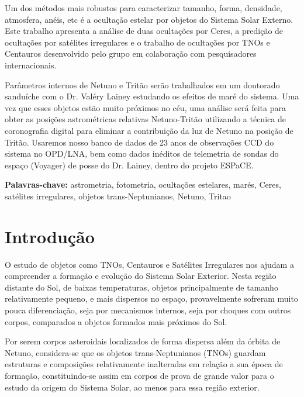 \documentclass[12pt,a4paper]{monografia}
\begin{document}
Um dos métodos mais robustos para caracterizar tamanho, forma, densidade, atmosfera, anéis, etc é a ocultação estelar por objetos do Sistema Solar Externo. Este trabalho apresenta a análise de duas ocultações por Ceres, a predição de ocultações por satélites irregulares e o trabalho de ocultações por TNOs e Centauros desenvolvido pelo grupo em colaboração com pesquisadores internacionais.

Parâmetros internos de Netuno e Tritão serão trabalhados em um doutorado sanduíche com o Dr. Valéry Lainey estudando os efeitos de maré do sistema. Uma vez que esses objetos estão muito próximos no céu, uma análise será feita para obter as posições astrométricas relativas Netuno-Tritão utilizando a técnica de coronografia digital para eliminar a contribuição da luz de Netuno na posição de Tritão. Usaremos nosso banco de dados de 23 anos de observações CCD do sistema no OPD/LNA, bem como dados inéditos de telemetria de sondas do espaço (Voyager) de posse do Dr. Lainey, dentro do projeto ESPaCE.

\par
\vspace{1em}
\noindent\textbf{Palavras-chave:} astrometria, fotometria, ocultações estelares, marés, Ceres, satélites irregulares, objetos trans-Neptunianos, Netuno, Tritao


\tableofcontents %
\thispagestyle{empty} %

\pagestyle{ruledheader}

\chapter{Introdução}
\label{Cap: intro}

\indent \indent O estudo de objetos como TNOs, Centauros e Satélites Irregulares nos ajudam a compreender a formação e evolução do Sistema Solar Exterior. Nesta região distante do Sol, de baixas temperaturas, objetos principalmente de tamanho relativamente pequeno, e mais dispersos no espaço, provavelmente sofreram muito pouca diferenciação, seja por mecanismos internos, seja por choques com outros corpos, comparados a objetos formados mais próximos do Sol.

Por serem corpos asteroidais localizados de forma dispersa além da órbita de Netuno, considera-se que os objetos trans-Neptunianos (TNOs) guardam estruturas e composições relativamente inalteradas em relação a sua época de formação, constituindo-se assim em corpos de prova de grande valor para o estudo da origem do Sistema Solar, ao menos para essa região exterior.
\end{document}
